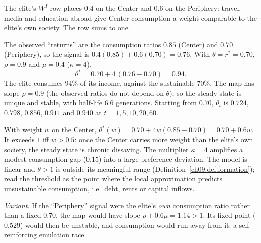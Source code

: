 \documentclass[../solutions_manual.tex]{subfiles}
\begin{document}

 The elite's $W^I$ row places $0.4$ on the Center and $0.6$ on the Periphery: travel, media and education abroad give Center consumption a weight comparable to the elite's own society. The row sums to one.

 The observed ``returns'' are the consumption ratios $0.85$ (Center) and $0.70$ (Periphery), so the signal is $0.4(0.85) + 0.6(0.70) = 0.76$. With $\bar\theta = r^* = 0.70$, $\rho = 0.9$ and $\mu = 0.4$ ($\kappa = 4$),
\[
\theta^* = 0.70 + 4\,(0.76 - 0.70) = 0.94 .
\]
The elite consumes $94\%$ of its income, against the sustainable $70\%$. The map has slope $\rho = 0.9$ (the observed ratios do not depend on $\theta$), so the steady state is unique and stable, with half-life $6.6$ generations. Starting from $0.70$, $\theta_t$ is $0.724$, $0.798$, $0.856$, $0.911$ and $0.940$ at $t = 1, 5, 10, 20, 60$.

 With weight $w$ on the Center, $\theta^*(w) = 0.70 + 4w(0.85 - 0.70) = 0.70 + 0.6w$. It exceeds $1$ iff $w > 0.5$: once the Center carries more weight than the elite's own society, the steady state is chronic dissaving. The multiplier $\kappa = 4$ amplifies a modest consumption gap ($0.15$) into a large preference deviation. The model is linear and $\theta > 1$ is outside its meaningful range (Definition~\ref{ch09:def:formation}); read the threshold as the point where the local approximation predicts unsustainable consumption, i.e.\ debt, rents or capital inflows.

\emph{Variant.} If the ``Periphery'' signal were the elite's \emph{own} consumption ratio rather than a fixed $0.70$, the map would have slope $\rho + 0.6\mu = 1.14 > 1$. Its fixed point ($0.529$) would then be unstable, and consumption would run away from it: a self-reinforcing emulation race.
\end{document}

